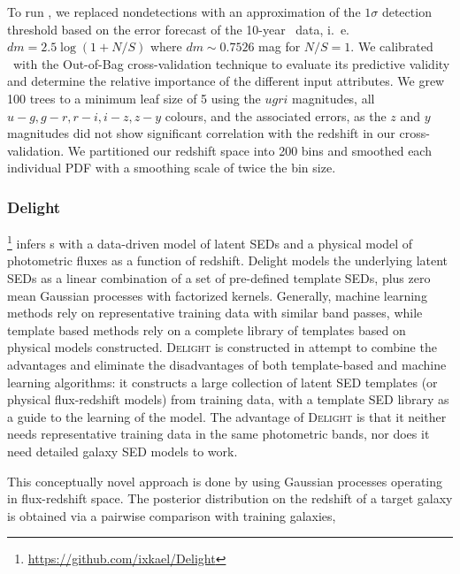 To run \tpz, we replaced nondetections with an approximation of the $1\sigma$ detection threshold based on the error forecast of the 10-year \lsst\ data, i.~e. $dm = 2.5 \log (1 + N/S)$ where $dm \sim 0.7526$ mag for $N/S = 1$.
We calibrated \tpz\ with the Out-of-Bag cross-validation technique \citep{Breiman:84,Carrasco_Kind:13} to evaluate its predictive validity and determine the relative importance of the different input attributes.
We grew 100 trees to a minimum leaf size of 5 using the $ugri$ magnitudes, all $u-g, g-r, r-i, i-z, z-y$ colours, and the associated errors, as the $z$ and $y$ magnitudes did not show significant correlation with the redshift in our cross-validation.
We partitioned our redshift space into 200 bins and smoothed each individual PDF with a smoothing scale of twice the bin size.

\subsubsection{Delight}
\label{sec:delight}

\delight \footnote{\url{https://github.com/ixkael/Delight}} \citep{Leistedt:17} infers \pz s with a data-driven model of latent SEDs and a physical model of photometric fluxes as a function of redshift.
Delight models the underlying latent SEDs as a linear combination of a set of pre-defined template SEDs, plus zero mean Gaussian processes with factorized kernels.
Generally, machine learning methods rely on representative training data with similar band passes, while template based methods rely on a complete library of templates based on physical models constructed.
\textsc{Delight} is constructed in attempt to combine the advantages and eliminate the disadvantages of both template-based and machine learning algorithms: it constructs a large collection of latent SED templates (or physical flux-redshift models) from training data, with a template SED library as a guide to the learning of the model.
The advantage of \textsc{Delight} is that it neither needs representative training data in the same photometric bands, nor does it need detailed galaxy SED models to work.

This conceptually novel approach is done by using Gaussian processes operating in flux-redshift space.
The posterior distribution on the redshift of a target galaxy is obtained via a pairwise comparison with training galaxies,

